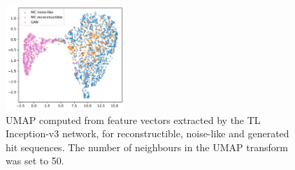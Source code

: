 \begin{figure}
    \centering
    \includegraphics[width=0.4\textwidth]{chapter4/umap_TL_fid_singlefit.pdf}
    \caption{ UMAP computed from feature vectors extracted by the TL
        Inception-v3 network, for reconstructible, noise-like and generated hit
        sequences. The number of neighbours in the UMAP transform was set to
        50. }
    \label{fig:umap}
\end{figure}





